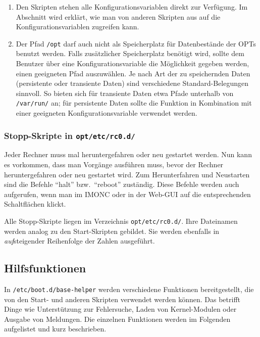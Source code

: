 \begin{enumerate}
  \item Den Skripten stehen alle Konfigurationsvariablen
    direkt zur Verfügung. Im Abschnitt  wird erklärt, wie man von anderen Skripten
    aus auf die Konfigurationsvariablen zugreifen kann.

  \item Der Pfad \texttt{/opt} darf auch nicht als Speicherplatz für
    Datenbestände der OPTs benutzt werden. Falls zusätzlicher
    Speicherplatz benötigt wird, sollte dem Benutzer über eine
    Konfigurationsvariable die Möglichkeit gegeben werden, einen geeigneten
    Pfad auszuwählen. Je nach Art der zu speichernden Daten (persistente oder
    transiente Daten) sind verschiedene Standard-Belegungen sinnvoll. So bieten
    sich für transiente Daten etwa Pfade unterhalb von \texttt{/var/run/} an;
    für persistente Daten sollte die Funktion
     in Kombination mit einer
    geeigneten Konfigurationsvariable verwendet werden.

\end{enumerate}

\subsubsection{Stopp-Skripte in \texttt{opt/etc/rc0.d/}}

Jeder Rechner muss mal heruntergefahren oder neu gestartet werden. Nun kann
es vorkommen, dass man Vorgänge ausführen muss, bevor der Rechner
heruntergefahren oder neu gestartet wird. Zum Herunterfahren und Neustarten
sind die Befehle "`halt"' bzw.\ "`reboot"' zuständig. Diese Befehle werden auch
aufgerufen, wenn man im IMONC oder in der Web-GUI auf die entsprechenden
Schaltflächen klickt.

Alle Stopp-Skripte liegen im Verzeichnis \texttt{opt/etc/rc0.d/}. Ihre Dateinamen
werden analog zu den Start-Skripten gebildet. Sie werden ebenfalls in
\emph{auf}steigender Reihenfolge der Zahlen ausgeführt.

\subsection{Hilfsfunktionen}

In \texttt{/etc/boot.d/base-helper} werden verschiedene Funktionen
bereitgestellt, die von den Start- und anderen Skripten verwendet werden
können. Das betrifft Dinge wie Unterstützung zur Fehlersuche, Laden von
Kernel-Modulen oder Ausgabe von Meldungen.
Die einzelnen Funktionen werden im Folgenden aufgelistet und kurz beschrieben.

